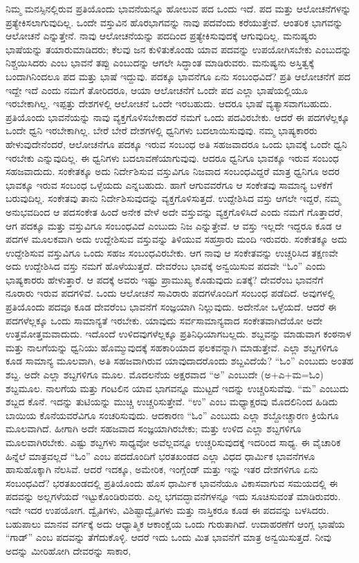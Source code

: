 ನಿಮ್ಮ ಮನಸ್ಸಿನಲ್ಲಿರುವ ಪ್ರತಿಯೊಂದು ಭಾವನೆಯನ್ನೂ ಹೋಲುವ ಪದ ಒಂದು ಇದೆ. ಪದ ಮತ್ತು ಆಲೋಚನೆಗಳನ್ನು ಪ್ರತ್ಯೇಕಿಸಲಾಗುವುದಿಲ್ಲ. ಒಂದೇ ವಸ್ತುವಿನ ಹೊರಭಾಗವನ್ನು ನಾವು ಪದವೆಂದು ಕರೆಯುತ್ತೇವೆ. ಆಂತರಿಕ ಭಾಗವನ್ನು ಆಲೋಚನೆ ಎನ್ನುತ್ತೇನೆ. ನಾವು ಆಲೋಚನೆಯನ್ನು ಪದದಿಂದ ಪ್ರತ್ಯೇಕಿಸುವುದಕ್ಕೆ ಆಗುವುದಿಲ್ಲ. ಮನುಷ್ಯರು ಭಾಷೆಯನ್ನು ತಯಾರುಮಾಡಿದರು; ಕೆಲವು ಜನ ಕುಳಿತುಕೊಂಡು ಯಾವ ಪದವನ್ನು ಉಪಯೋಗಿಸಬೇಕು ಎಂಬುದನ್ನು ನಿಶ್ಚಯಿಸಿದರು ಎಂಬ ಭಾವನೆ ತಪ್ಪು ಎಂಬುದನ್ನು ಆಗಲೇ ಸಿದ್ಧಾಂತ ಮಾಡಿರುವರು. ಮನುಷ್ಯನು ಅಸ್ತಿತ್ವಕ್ಕೆ ಬಂದಾಗಿನಿಂದಲೂ ಪದ ಮತ್ತು ಭಾಷೆ ಇದ್ದುವು. ಪದಕ್ಕೂ ಭಾವನೆಗೂ ಏನು ಸಂಬಂಧವಿದೆ? ಪ್ರತಿ ಆಲೋಚನೆಗೆ ಪದ ಇದ್ದೇ ಇದೆ ಎಂದು ನಮಗೆ ತೋರಿದರೂ, ಆಯಾ ಆಲೋಚನೆಗೆ ಒಂದೇ ಪದ ಎಲ್ಲಾ ಭಾಷೆಯಲ್ಲಿಯೂ ಇರಬೇಕಾಗಿಲ್ಲ. ಇಪ್ಪತ್ತು ದೇಶಗಳಲ್ಲಿ ಆಲೋಚನೆ ಒಂದೇ ಇರಬಹುದು. ಆದರೂ ಭಾಷೆ ವ್ಯತ್ಯಾಸವಾಗಬಹುದು. ಪ್ರತಿಯೊಂದು ಭಾವನೆಯನ್ನು ನಾವು ವ್ಯಕ್ತಗೊಳಿಸಬೇಕಾದರೆ ನಮಗೆ ಒಂದು ಪದವಿರಬೇಕು. ಆದರೆ ಈ ಪದಗಳೆಲ್ಲಕ್ಕೂ ಒಂದೇ ಧ್ವನಿ ಇರಬೇಕಾಗಿಲ್ಲ. ಬೇರೆ ಬೇರೆ ದೇಶಗಳಲ್ಲಿ ಧ್ವನಿಗಳು ಬದಲಾಯಿಸುವುವು. ನಮ್ಮ ಭಾಷ್ಯಕಾರರು ಹೇಳುವುದೇನೆಂದರೆ, ಆಲೋಚನೆಗೂ ಪದಕ್ಕೂ ಇರುವ ಸಂಬಂಧ ಅತಿ ಸಹಜವಾದರೂ ಒಂದು ಭಾವಕ್ಕೆ ಒಂದೇ ಧ್ವನಿ ಇರಬೇಕು ಎನ್ನುವುದಿಲ್ಲ. ಈ ಧ್ವನಿಗಳು ಬದಲಾವಣೆಯಾಗುವುವು. ಆದರೂ ಧ್ವನಿಗೂ ಭಾವಕ್ಕೂ ಇರುವ ಸಂಬಂಧ ಸಹಜವಾದುದು. ಸಂಕೇತಕ್ಕೂ ಅದು ನಿರ್ದೇಶಿಸುವ ವಸ್ತುವಿಗೂ ನಿಜವಾದ ಸಂಬಂಧವಿದ್ದರೆ ಮಾತ್ರ ಧ್ವನಿಗೂ ಅದರ ಭಾವಕ್ಕೂ ಇರುವ ಸಂಬಂಧ ಒಳ್ಳೆಯದು ಎನ್ನಬಹುದು. ಹಾಗೆ ಆಗುವವರೆಗೂ ಆ ಸಂಕೇತವು ಸಾಮಾನ್ಯ ಬಳಕೆಗೆ ಬರುವುದಿಲ್ಲ. ಸಂಕೇತವು ತಾನು ನಿರ್ದೇಶಿಸುವುದನ್ನು ವ್ಯಕ್ತಗೊಳಿಸುತ್ತದೆ. ಉದ್ದೇಶಿಸಿದ ವಸ್ತು ಆಗಲೇ ಇದ್ದರೆ, ನಮ್ಮ ಅನುಭವದಿಂದ ಆ ಪದಸಂಕೇತ ಹಿಂದೆ ಅನೇಕ ವೇಳೆ ಅದೇ ವಸ್ತುವನ್ನು ವ್ಯಕ್ತಗೊಳಿಸಿದೆ ಎಂದು ನಮಗೆ ಗೊತ್ತಾದರೆ, ಆಗ ಪದಕ್ಕೂ ಮತ್ತು ವಸ್ತುವಿಗೂ ಸಂಬಂಧವಿದೆ ಎಂಬುದು ನಿಜ ಎನ್ನುತ್ತೇವೆ. ಆ ವಸ್ತು ಇಲ್ಲದೇ ಇದ್ದರೂ ಕೂಡ ಆ ಪದಗಳ ಮೂಲಕವಾಗಿ ಅದು ಉದ್ದೇಶಿಸುವ ವಸ್ತುವನ್ನು ತಿಳಿಯುವ ಸಹಸ್ರಾರು ಮಂದಿ ಇರುವರು. ಸಂಕೇತಕ್ಕೂ ಅದು ಉದ್ದೇಶಿಸುವ ವಸ್ತುವಿಗೂ ಒಂದು ಸಹಜ ಸಂಬಂಧವಿರಬೇಕು. ಆಗ ನಾವು ಆ ಸಂಕೇತವನ್ನು ಉಚ್ಚರಿಸಿದ ತಕ್ಷಣವೇ ಅದು ಉದ್ದೇಶಿಸಿದ ವಸ್ತು ನಮಗೆ ಹೊಳೆಯುತ್ತದೆ. ದೇವರೆಂಬ ಭಾವಕ್ಕೆ ಅನ್ವಯಿಸುವ ಪದವೇ “ಓಂ” ಎಂದು ಭಾಷ್ಯಕಾರರು ಹೇಳುತ್ತಾರೆ. ಆ ಪದಕ್ಕೆ ಅವರು ಇಷ್ಟು ಪ್ರಾಮುಖ್ಯ ಕೊಡುವುದು ಏತಕ್ಕೆ? ದೇವರೆಂಬ ಭಾವನೆಗೆ ನೂರಾರು ಇರುವ ಪದಗಳಿವೆ. ಒಂದು ಆಲೋಚನೆ ಸಾವಿರಾರು ಪದಗಳೊಂದಿಗೆ ಸಂಬಂಧ ಪಡೆದಿದೆ. ಅವುಗಳಲ್ಲಿ ಪ್ರತಿಯೊಂದು ಪದವೂ ಕೂಡ ದೇವರೆಂಬ ಭಾವನೆಗೆ ಸಂಜ್ಞಯಾಗಿ ನಿಲ್ಲುವುದು. ಅದೇನೋ ಒಳ್ಳೆಯದೆ. ಆದರೆ ಈ ಪದಗಳೆಲ್ಲಕ್ಕೂ ಒಂದು ಸಾಮಾನ್ಯತೆ ಇರಬೇಕು. ಯಾವುದು ಸರ್ವಸಾಮಾನ್ಯವಾದ ಸಂಕೇತವಾಗಿದೆಯೋ ಅದೇ ಉತ್ತಮೋತ್ತಮವಾದುದು. ಇದೊಂದೆ ಉಳಿದವುಗಳೆಲ್ಲಕ್ಕೂ ಪ್ರತಿನಿಧಿಯಾಗಬಲ್ಲದು. ಶಬ್ದವನ್ನು ಮಾಡುವಾಗ ಕಂಠನಾಳ ಮತ್ತು ನಾಲಗೆಯನ್ನು ಧ್ವನಿಯು ಹೊಮ್ಮುವುದಕ್ಕೆ ಸಹಕಾರಿಯಾದ ಫಲಕವನ್ನಾಗಿ ಮಾಡುತ್ತೇವೆ. ಎಲ್ಲಾ ಶಬ್ದಗಳಿಗೂ ಕೂಡ ಸಾಮಾನ್ಯ ಮೂಲವಾಗಿ, ಅತಿ ಸಹಜವಾಗಿರುವ ಯಾವುದಾದರೊಂದು ಶಬ್ದವಿದೆಯೆ? “ಓಂ” ಎಂಬುದು ಅಂತಹ ಶಬ್ದ. ಅದೇ ಎಲ್ಲಾ ಶಬ್ದಗಳಿಗೂ ಮೂಲ. ಮೊದಲನೆಯ ಅಕ್ಷರವಾದ “ಅ” ಎಂಬುದೇ (ಅ+ಎ+ಮ=ಓಂ) ಶಬ್ದಮೂಲ. ನಾಲಗೆಯ ಮತ್ತು ಗಂಟಲಿನ ಯಾವ ಭಾಗವನ್ನೂ ಮುಟ್ಟದೆ ಇದನ್ನು ಉಚ್ಚರಿಸುವೆವು. “ಮ” ಎಂಬುದು ಶಬ್ದದ ಕೊನೆ. ಇದನ್ನು ತುಟಿಯನ್ನು ಮುಚ್ಚಿ ಉಚ್ಚರಿಸುತ್ತೇವೆ. “ಉ” ಎಂಬ ಮಧ್ಯಾಕ್ಷರವು ಮೊದಲಿನಿಂದ ಹಿಡಿದು ಬಾಯಿಯ ಕೊನೆಯವರೆವಿಗೂ ಸಂಚರಿಸುವುದು. ಆದಕಾರಣ “ಓಂ” ಎಂಬುದು ಎಲ್ಲಾ ಶಬ್ದೋಚ್ಚಾರಣ ಕ್ರಿಯೆಗೂ ಮೂಲವಾಗಿದೆ. ಹೀಗಾಗಿ ಅದೇ ಸಹಜವಾದ ಸಂಜ್ಞಯಾಗಿರಬೇಕು; ಮತ್ತು ಉಳಿದ ಎಲ್ಲಾ ಶಬ್ದಗಳಿಗೂ ಮೂಲವಾಗಿರಬೇಕು. ಎಷ್ಟು ಶಬ್ದಗಳು ಸಾಧ್ಯವೋ ಅವೆಲ್ಲವನ್ನೂ ಉಚ್ಚರಿಸುವುದಕ್ಕೆ ಇದರಿಂದ ಸಾಧ್ಯ. ಈ ವೈಚಾರಿಕ ಹಿನ್ನೆಲೆ ಮಾತ್ರವಲ್ಲದೆ “ಓಂ” ಎಂಬ ಪದದೊಂದಿಗೆ ಭರತಖಂಡದ ಎಲ್ಲಾ ವಿಧದ ಧಾರ್ಮಿಕ ಭಾವನೆಗಳೂ ಹಾಸುಹೊಕ್ಕಾಗಿ ನೆಲಸಿವೆ. ಆದರೆ ಇದಕ್ಕೂ, ಅಮೇರಿಕ, ಇಂಗ್ಲೆಂಡ್​ ಮತ್ತು ಇನ್ನು ಇತರ ದೇಶಗಳಿಗೂ ಏನು ಸಂಬಂಧವಿದೆ? ಭರತಖಂಡದಲ್ಲಿ ಪ್ರತಿಯೊಂದು ಹೊಸ ಧಾರ್ಮಿಕ ಭಾವನೆಯೂ ವಿಕಾಸವಾಗುವ ಸಮಯದಲ್ಲಿ ಈ ಪದವನ್ನು ಅಲ್ಲಗಳೆಯದೆ ಇಟ್ಟುಕೊಂಡಿರುವರು. ಎಲ್ಲ ಭಗವದ್ಭಾವನೆಗಳನ್ನೂ ಇದು ಸೂಚಿಸುವಂತೆ ಮಾಡಿರುವರು. ಇದೇ ಇದರ ಉಪಯೋಗ. ದ್ವೈತಿಗಳು, ವಿಶಿಷ್ಟಾದ್ವೈತಿಗಳು ಮತ್ತು ನಾಸ್ತಿಕರೂ ಕೂಡ ಈ ಪದವನ್ನು ಬಳಸಿದರು. ಬಹುಪಾಲು ಮಾನವ ವರ್ಗಕ್ಕೆ ಅದು ಆಧ್ಯಾತ್ಮಿಕ ಆಕಾಂಕ್ಷೆಯ ಒಂದು ಗುರುತಾಗಿದೆ. ಉದಾಹರಣೆಗೆ ಆಂಗ್ಲ ಭಾಷೆಯ “ಗಾಡ್​” ಎಂಬ ಪದವನ್ನು ತೆಗೆದುಕೊಳ್ಳಿ. ಆದರೆ ಇದು ಒಂದು ಮಿತ ಭಾವನೆಗೆ ಮಾತ್ರ ಅನ್ವಯಿಸುತ್ತದೆ. ನೀವು ಅದನ್ನು ಮೀರಿಹೋಗಿ ದೇವರನ್ನು ಸಾಕಾರ, 